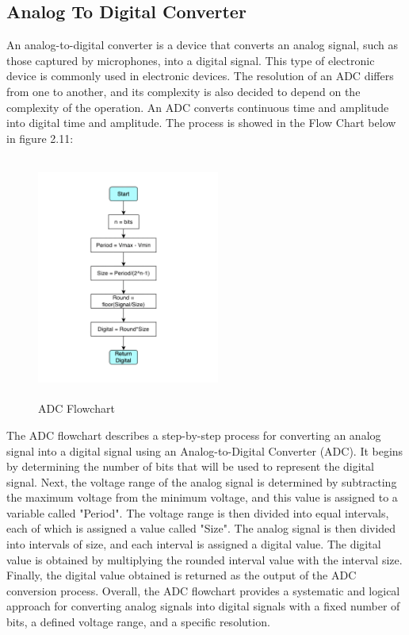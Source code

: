 \documentclass{report}
\begin{document}
\subsection{Analog To Digital Converter}
An analog-to-digital converter is a device that converts an analog signal, such as those captured by microphones, into a digital signal. This type of electronic device is commonly used in electronic devices. The resolution of an ADC differs from one to another, and its complexity is also decided to depend on the complexity of the operation. An ADC converts continuous time and amplitude into digital time and amplitude.
The process is showed in the Flow Chart below in figure 2.11:
\begin{figure}[h!]
    \centering
    \includegraphics[width=6cm, height=8cm] {ADC.png}
    \caption{ADC Flowchart}
    \label{fig:my_label}
\end{figure}
\hfill \break
The ADC flowchart describes a step-by-step process for converting an analog signal into a digital signal using an Analog-to-Digital Converter (ADC). It begins by determining the number of bits that will be used to represent the digital signal. Next, the voltage range of the analog signal is determined by subtracting the maximum voltage from the minimum voltage, and this value is assigned to a variable called "Period". The voltage range is then divided into equal intervals, each of which is assigned a value called "Size". The analog signal is then divided into intervals of size, and each interval is assigned a digital value. The digital value is obtained by multiplying the rounded interval value with the interval size. Finally, the digital value obtained is returned as the output of the ADC conversion process. Overall, the ADC flowchart provides a systematic and logical approach for converting analog signals into digital signals with a fixed number of bits, a defined voltage range, and a specific resolution.
\end{document}
